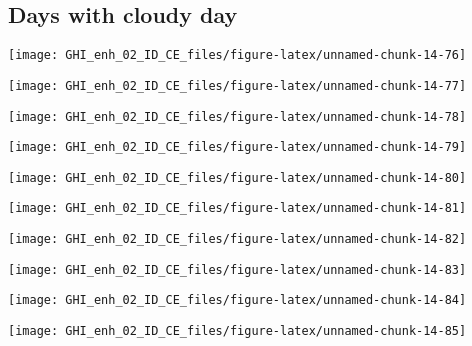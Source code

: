 \documentclass[
  10pt,
  a4paper,oneside]{article}
\begin{document}
\FloatBarrier

\hypertarget{days-with-cloudy-day}{%
\subsection{Days with cloudy day}\label{days-with-cloudy-day}}

\begin{center}\texttt{[image: GHI\_enh\_02\_ID\_CE\_files/figure-latex/unnamed-chunk-14-76]} \end{center}

\begin{center}\texttt{[image: GHI\_enh\_02\_ID\_CE\_files/figure-latex/unnamed-chunk-14-77]} \end{center}

\begin{center}\texttt{[image: GHI\_enh\_02\_ID\_CE\_files/figure-latex/unnamed-chunk-14-78]} \end{center}

\begin{center}\texttt{[image: GHI\_enh\_02\_ID\_CE\_files/figure-latex/unnamed-chunk-14-79]} \end{center}

\begin{center}\texttt{[image: GHI\_enh\_02\_ID\_CE\_files/figure-latex/unnamed-chunk-14-80]} \end{center}

\begin{center}\texttt{[image: GHI\_enh\_02\_ID\_CE\_files/figure-latex/unnamed-chunk-14-81]} \end{center}

\begin{center}\texttt{[image: GHI\_enh\_02\_ID\_CE\_files/figure-latex/unnamed-chunk-14-82]} \end{center}

\begin{center}\texttt{[image: GHI\_enh\_02\_ID\_CE\_files/figure-latex/unnamed-chunk-14-83]} \end{center}

\begin{center}\texttt{[image: GHI\_enh\_02\_ID\_CE\_files/figure-latex/unnamed-chunk-14-84]} \end{center}

\begin{center}\texttt{[image: GHI\_enh\_02\_ID\_CE\_files/figure-latex/unnamed-chunk-14-85]} \end{center}
\end{document}
